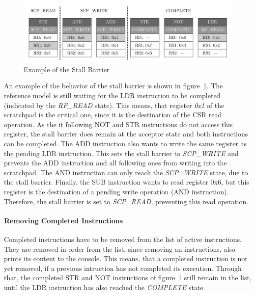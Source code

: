 \begin{figure}[htb]
 \centering
 \includegraphics[width=1.0\textwidth,angle=0]{images/stall_barrier_example}
 \caption{Example of the Stall Barrier}
\label{fig:stall_barrier_example}
\end{figure}

An example of the behavior of the stall barrier is shown in figure~\ref{fig:stall_barrier_example}.
The reference model is still waiting for the LDR instruction to be completed (indicated by the \emph{RF\_READ} state).
This means, that register \emph{0x1} of the scratchpad is the critical one, since it is the destination of the CSR read operation.
As the it following NOT and STR instructions do not access this register, the stall barrier does remain at the acceptor state and both instructions can be
completed.
The ADD instruction also wants to write the same register as the pending LDR instruction.
This sets the stall barrier to \emph{SCP\_WRITE} and prevents the ADD instruction and all following ones from writing into the scratchpad.
The AND instruction can only reach the \emph{SCP\_WRITE} state, due to the stall barrier.
Finally, the SUB instruction wants to read register 0x6, but this register is the destination of a pending write operation (AND instruction).
Therefore, the stall barrier is set to \emph{SCP\_READ}, preventing this read operation.

\paragraph{Removing Completed Instructions}

Completed instructions have to be removed from the list of active instructions.
They are removed in order from the list, since removing an instructions, also prints its content to the console.
This means, that a completed instruction is not yet removed, if a previous intruction has not completed its execution.
Through that, the completed STR and NOT instructions of figure~\ref{fig:stall_barrier_example} still remain in the list, until the LDR instruction has also
reached the \emph{COMPLETE} state.


